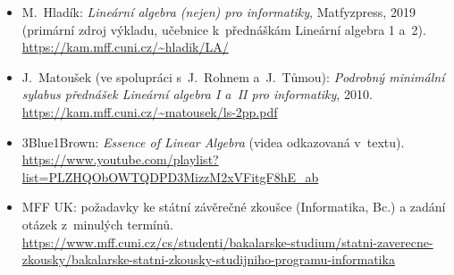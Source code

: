 \documentclass[11pt,a4paper]{article}
\newcommand{\playlist}{https://www.youtube.com/playlist?list=PLZHQObOWTQDPD3MizzM2xVFitgF8hE_ab}
\begin{document}
{\raggedright
\begin{itemize}
  \item M.~Hladík: \emph{Lineární algebra (nejen) pro informatiky}, Matfyzpress, 2019 (primární zdroj výkladu, učebnice k~přednáškám Lineární algebra 1 a~2).\\ \url{https://kam.mff.cuni.cz/~hladik/LA/}
  \item J.~Matoušek (ve spolupráci s~J.~Rohnem a~J.~Tůmou): \emph{Podrobný minimální sylabus přednášek Lineární algebra I a~II pro informatiky}, 2010.\\ \url{https://kam.mff.cuni.cz/~matousek/ls-2pp.pdf}
  \item 3Blue1Brown: \emph{Essence of Linear Algebra} (videa odkazovaná v~textu).\\ \url{\playlist}
  \item MFF UK: požadavky ke státní závěrečné zkoušce (Informatika, Bc.) a zadání otázek z~minulých termínů.\\ \url{https://www.mff.cuni.cz/cs/studenti/bakalarske-studium/statni-zaverecne-zkousky/bakalarske-statni-zkousky-studijniho-programu-informatika}
\end{itemize}
\par}
\end{document}
